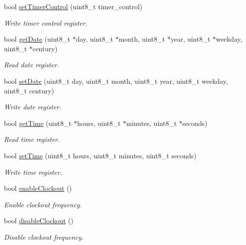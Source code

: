 \begin{DoxyCompactItemize}
bool \hyperlink{namespacePcf8563_a112b6debc61100cd3ab737af9d31e119}{set\+Timer\+Control} (uint8\+\_\+t timer\+\_\+control)
\begin{DoxyCompactList}\small\item\em Write timer control register. \end{DoxyCompactList}\item 
bool \hyperlink{namespacePcf8563_aa852ae63d80f0a9137b3910a3b193d89}{get\+Date} (uint8\+\_\+t $\ast$day, uint8\+\_\+t $\ast$month, uint8\+\_\+t $\ast$year, uint8\+\_\+t $\ast$weekday, uint8\+\_\+t $\ast$century)
\begin{DoxyCompactList}\small\item\em Read date register. \end{DoxyCompactList}\item 
bool \hyperlink{namespacePcf8563_aa8a735e59aae37d9184b17cb84de4f85}{set\+Date} (uint8\+\_\+t day, uint8\+\_\+t month, uint8\+\_\+t year, uint8\+\_\+t weekday, uint8\+\_\+t century)
\begin{DoxyCompactList}\small\item\em Write date register. \end{DoxyCompactList}\item 
bool \hyperlink{namespacePcf8563_aeb90b131ae770b2dcb9b167ea3856ed4}{get\+Time} (uint8\+\_\+t $\ast$hours, uint8\+\_\+t $\ast$minutes, uint8\+\_\+t $\ast$seconds)
\begin{DoxyCompactList}\small\item\em Read time register. \end{DoxyCompactList}\item 
bool \hyperlink{namespacePcf8563_a797213f5e675582765df0b42ab921999}{set\+Time} (uint8\+\_\+t hours, uint8\+\_\+t minutes, uint8\+\_\+t seconds)
\begin{DoxyCompactList}\small\item\em Write time register. \end{DoxyCompactList}\item 
bool \hyperlink{namespacePcf8563_a03e4ea0f00fd48664537788ba491fa60}{enable\+Clockout} ()
\begin{DoxyCompactList}\small\item\em Enable clockout frequency. \end{DoxyCompactList}\item 
bool \hyperlink{namespacePcf8563_a76c81b3e0f59f5e4e80dd8807c199856}{disable\+Clockout} ()
\begin{DoxyCompactList}\small\item\em Disable clockout frequency. \end{DoxyCompactList}\item 

\end{DoxyCompactItemize}
